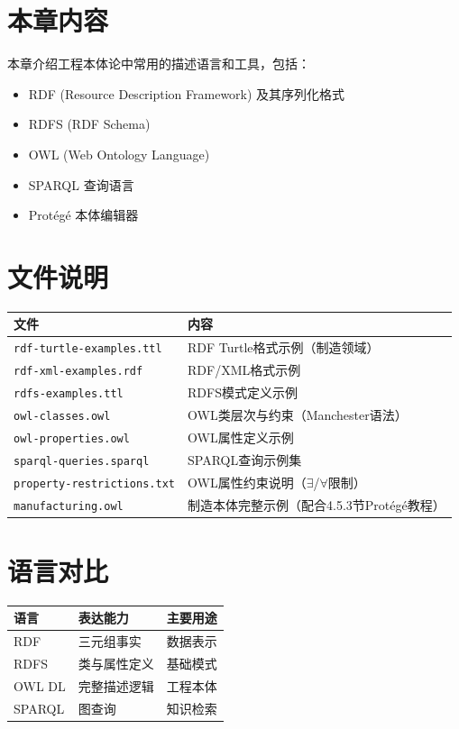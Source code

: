 
\section{本章内容}

本章介绍工程本体论中常用的描述语言和工具，包括：
\begin{itemize}
\item RDF (Resource Description Framework) 及其序列化格式
\item RDFS (RDF Schema)
\item OWL (Web Ontology Language)
\item SPARQL 查询语言
\item Protégé 本体编辑器
\end{itemize}

\section{文件说明}

\begin{center}
\begin{tabularx}{\linewidth}{@{}XX@{}}
\toprule
\textbf{文件} & \textbf{内容} \\
\midrule
\texttt{rdf-turtle-examples.ttl} & RDF Turtle格式示例（制造领域） \\
\texttt{rdf-xml-examples.rdf} & RDF/XML格式示例 \\
\texttt{rdfs-examples.ttl} & RDFS模式定义示例 \\
\texttt{owl-classes.owl} & OWL类层次与约束（Manchester语法） \\
\texttt{owl-properties.owl} & OWL属性定义示例 \\
\texttt{sparql-queries.sparql} & SPARQL查询示例集 \\
\texttt{property-restrictions.txt} & OWL属性约束说明（\(\exists\)/\(\forall\)限制） \\
\texttt{manufacturing.owl} & 制造本体完整示例（配合4.5.3节Protégé教程） \\
\bottomrule
\end{tabularx}
\end{center}

\section{语言对比}

\begin{center}
\begin{tabular}{@{}lll@{}}
\toprule
\textbf{语言} & \textbf{表达能力} & \textbf{主要用途} \\
\midrule
RDF & 三元组事实 & 数据表示 \\
RDFS & 类与属性定义 & 基础模式 \\
OWL DL & 完整描述逻辑 & 工程本体 \\
SPARQL & 图查询 & 知识检索 \\
\bottomrule
\end{tabular}
\end{center}


